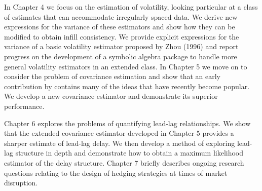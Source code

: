 In Chapter 4 we focus on the estimation of volatility, looking particular at a class of estimates that can accommodate irregularly spaced data.  We derive new expressions for the variance of these estimators and show how they can be modified to obtain infill consistency. We provide explicit expressions for the variance of a basic volatility estimator proposed by Zhou (1996) and report progress on the development of a symbolic algebra package to handle more general volatility estimators in an extended class. In Chapter 5 we move on to consider the problem of covariance estimation and show that an early contribution by \citet{zhou1998estimating} contains many of the ideas that have recently become popular. We develop a new covariance estimator and demonstrate its superior performance. 

Chapter 6 explores the problems of quantifying lead-lag relationships. We show that the extended covariance estimator developed in Chapter 5 provides a sharper estimate of lead-lag delay. We then develop a method of exploring lead-lag structure in depth and demonstrate how to obtain a maximum likelihood estimator of the delay structure. Chapter 7 briefly describes ongoing research questions relating to the design of hedging strategies at times of market disruption. 

